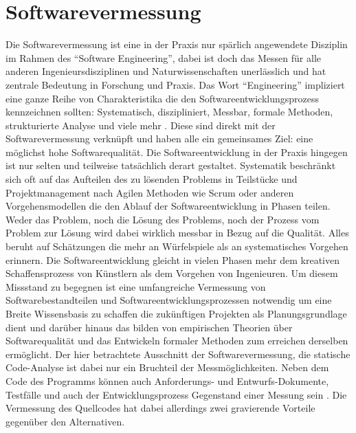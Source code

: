 \documentclass[gb,ngerman]{stthesis}
\begin{document}
	\chapter{Softwarevermessung} \label{Kapitel2}
  		Die Softwarevermessung ist eine in der Praxis nur spärlich angewendete Disziplin im Rahmen des "`Software Engineering"', dabei ist doch das Messen für alle anderen Ingenieursdisziplinen und Naturwissenschaften unerlässlich und hat zentrale Bedeutung in Forschung und Praxis. Das Wort "`Engineering"' impliziert eine ganze Reihe von Charakteristika die den Softwareentwicklungsprozess kennzeichnen sollten: Systematisch, diszipliniert, Messbar, formale Methoden, strukturierte Analyse und viele mehr \cite{SoftwareMeasurement}. Diese sind direkt mit der Softwarevermessung verknüpft und haben alle ein gemeinsames Ziel: eine möglichst hohe Softwarequalität. Die Softwareentwicklung in der Praxis hingegen ist nur selten und teilweise tatsächlich derart gestaltet. Systematik beschränkt sich oft auf das Aufteilen des zu lösenden Problems in Teilstücke und Projektmanagement nach Agilen Methoden wie Scrum oder anderen Vorgehensmodellen die den Ablauf der Softwareentwicklung in Phasen teilen. Weder das Problem, noch die Lösung des Problems, noch der Prozess vom Problem zur Lösung wird dabei wirklich messbar in Bezug auf die Qualität. Alles beruht auf Schätzungen die mehr an Würfelspiele als an systematisches Vorgehen erinnern. Die Softwareentwicklung gleicht in vielen Phasen mehr dem kreativen Schaffensprozess von Künstlern als dem Vorgehen von Ingenieuren.\newline
  		Um diesem Missstand zu begegnen ist eine umfangreiche Vermessung von Softwarebestandteilen und Softwareentwicklungsprozessen notwendig um eine Breite Wissensbasis zu schaffen die zukünftigen Projekten als Planungsgrundlage dient und darüber hinaus das bilden von empirischen Theorien über Softwarequalität und das Entwickeln formaler Methoden zum erreichen derselben ermöglicht. \newline
  		Der hier betrachtete Ausschnitt der Softwarevermessung, die statische Code-Analyse ist dabei nur ein Bruchteil der Messmöglichkeiten. Neben dem Code des Programms können auch Anforderungs- und Entwurfs-Dokumente, Testfälle und auch der Entwicklungsprozess Gegenstand einer Messung sein \cite{SoftwareInZahlen}. Die Vermessung des Quellcodes hat dabei allerdings zwei gravierende Vorteile gegenüber den Alternativen. 
\end{document}
